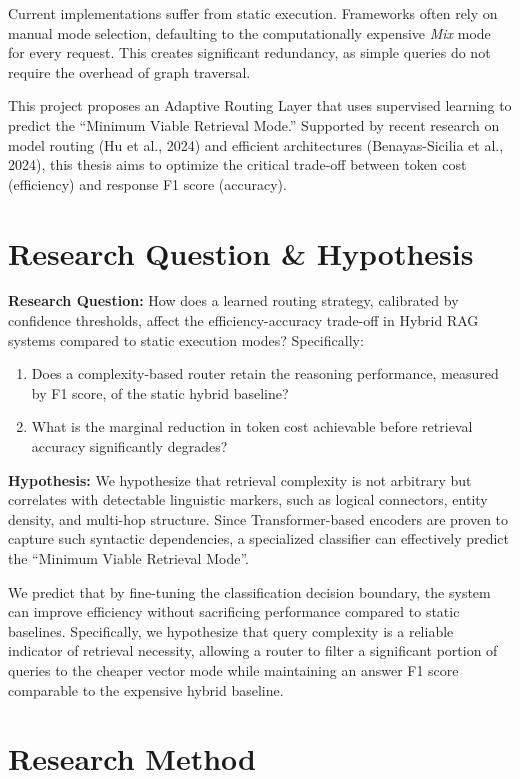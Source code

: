 \documentclass[11pt, a4paper]{article}
\begin{document}
Current implementations suffer from static execution. Frameworks often rely on manual mode selection, defaulting to the computationally expensive \emph{Mix} mode for every request. This creates significant redundancy, as simple queries do not require the overhead of graph traversal.

This project proposes an Adaptive Routing Layer that uses supervised learning to predict the ``Minimum Viable Retrieval Mode.'' Supported by recent research on model routing (Hu et al., 2024) and efficient architectures (Benayas-Sicilia et al., 2024), this thesis aims to optimize the critical trade-off between token cost (efficiency) and response F1 score (accuracy).

\section{Research Question \& Hypothesis}

\textbf{Research Question:} How does a learned routing strategy, calibrated by confidence thresholds, affect the efficiency-accuracy trade-off in Hybrid RAG systems compared to static execution modes? Specifically:
\begin{enumerate}[label=\roman*.]
    \item Does a complexity-based router retain the reasoning performance, measured by F1 score, of the static hybrid baseline?
    \item What is the marginal reduction in token cost achievable before retrieval accuracy significantly degrades?
\end{enumerate}

\textbf{Hypothesis:} We hypothesize that retrieval complexity is not arbitrary but correlates with detectable linguistic markers, such as logical connectors, entity density, and multi-hop structure. Since Transformer-based encoders are proven to capture such syntactic dependencies, a specialized classifier can effectively predict the ``Minimum Viable Retrieval Mode''.

We predict that by fine-tuning the classification decision boundary, the system can improve efficiency without sacrificing performance compared to static baselines. Specifically, we hypothesize that query complexity is a reliable indicator of retrieval necessity, allowing a router to filter a significant portion of queries to the cheaper vector mode while maintaining an answer F1 score comparable to the expensive hybrid baseline.

\section{Research Method}
\end{document}
